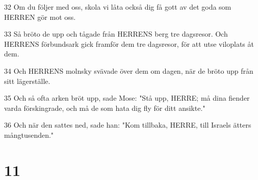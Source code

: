 \par 32 Om du följer med oss, skola vi låta också dig få gott av det goda som HERREN gör mot oss.
\par 33 Så bröto de upp och tågade från HERRENS berg tre dagsresor. Och HERRENS förbundsark gick framför dem tre dagsresor, för att utse viloplats åt dem.
\par 34 Och HERRENS molnsky svävade över dem om dagen, när de bröto upp från sitt lägerställe.
\par 35 Och så ofta arken bröt upp, sade Mose: "Stå upp, HERRE; må dina fiender varda förskingrade, och må de som hata dig fly för ditt ansikte."
\par 36 Och när den sattes ned, sade han: "Kom tillbaka, HERRE, till Israels ätters mångtusenden."

\chapter{11}

